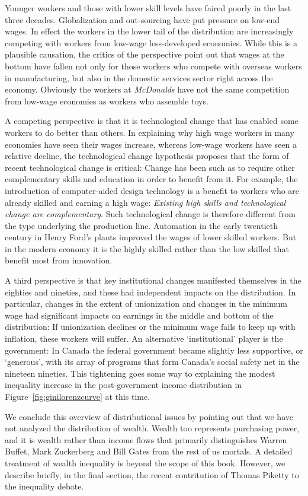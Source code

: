 Younger workers and those with lower skill levels have faired poorly in the
last three decades. Globalization and out-sourcing
have put pressure on low-end wages. In effect the workers in the lower tail of
the distribution are increasingly competing with workers from low-wage
less-developed economies. While this is a plausible causation, the critics
of the perspective point out that wages at the bottom have fallen not only
for those workers who compete with overseas workers in manufacturing, but
also in the domestic services sector right across the economy. Obviously the
workers at \textit{McDonalds} have not the same competition from low-wage economies
as workers who assemble toys.

A competing perspective is that it is technological change that has enabled
some workers to do better than others. In explaining why high wage workers
in many economies have seen their wages increase, whereas low-wage workers
have seen a relative decline, the technological change hypothesis proposes
that the form of recent technological change is critical: Change has been
such as to require other complementary skills and education in order to
benefit from it. For example, the introduction of computer-aided design
technology is a benefit to workers who are already skilled and earning a
high wage: \textit{Existing high skills and technological change are
	complementary}. Such technological change is therefore different from the
type underlying the production line. Automation in the early twentieth
century in Henry Ford's plants improved the wages of lower skilled workers.
But in the modern economy it is the highly skilled rather than the low
skilled that benefit most from innovation.

A third perspective is that key institutional changes manifested themselves
in the eighties and nineties, and these had independent impacts on the
distribution. In particular, changes in the extent of unionization and
changes in the minimum wage had significant impacts on earnings in the
middle and bottom of the distribution: If unionization declines or the
minimum wage fails to keep up with inflation, these workers will suffer. An
alternative `institutional' player is the government: In Canada the federal
government became slightly less supportive, or `generous', with its array of
programs that form Canada's social safety net in the nineteen nineties. This
tightening goes some way to explaining the modest inequality increase in the
post-government income distribution in Figure~\ref{fig:ginilorenzcurve} at
this time.

We conclude this overview of distributional issues by pointing out that we
have not analyzed the distribution of wealth. Wealth too represents
purchasing power, and it is wealth rather than income flows that primarily
distinguishes Warren Buffet, Mark Zuckerberg and Bill Gates from the rest of
us mortals. A detailed treatment of wealth inequality is beyond the scope of
this book. However, we describe briefly, in the final section, the recent
contritution of Thomas Piketty to the inequality debate.